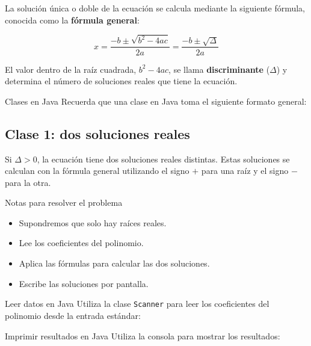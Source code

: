 \documentclass[
  spanish,
  11pt,
  a4paper,
  DIV=11,
  numbers=noendperiod]{scrartcl}
\providecommand{\tightlist}{\setlength{\itemsep}{0pt}\setlength{\parskip}{0pt}}
\begin{document}
La solución única o doble de la ecuación se calcula mediante la siguiente fórmula, conocida como la \textbf{fórmula general}:

\[
x = \frac{-b \pm \sqrt{b^2 - 4ac}}{2a} = \frac{-b \pm \sqrt{\Delta}}{2a}
\]

El valor dentro de la raíz cuadrada, \(b^2 - 4ac\), se llama \textbf{discriminante} (\(\Delta\)) y determina el número de soluciones reales que tiene la ecuación.

\begin{PracticeTipBox}{Clases en Java}
Recuerda que una clase en Java toma el siguiente formato general:

\end{PracticeTipBox}

\subsection{Clase 1: dos soluciones reales}\label{clase-1-dos-soluciones-reales}

Si \(\Delta > 0\), la ecuación tiene dos soluciones reales distintas. Estas soluciones se calculan con la fórmula general utilizando el signo \(+\) para una raíz y el signo \(-\) para la otra.

\begin{PracticeNoteBox}{Notas para resolver el problema}
\begin{itemize}
\tightlist
\item Supondremos que solo hay raíces reales.
\item Lee los coeficientes del polinomio.
\item Aplica las fórmulas para calcular las dos soluciones.
\item Escribe las soluciones por pantalla.
\end{itemize}
\end{PracticeNoteBox}

\begin{PracticeNoteBox}{Leer datos en Java}
Utiliza la clase \texttt{Scanner} para leer los coeficientes del polinomio desde la entrada estándar:

\end{PracticeNoteBox}

\begin{PracticeNoteBox}{Imprimir resultados en Java}
Utiliza la consola para mostrar los resultados:

\end{PracticeNoteBox}
\end{document}
